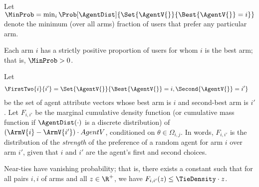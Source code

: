 Let $\MinProb = \min_{i} \Prob[\AgentDist]{\Set{\AgentV{}}{\Best{\AgentV{}} = i}}$
denote the minimum (over all arms) fraction of users that prefer any
particular arm.

\begin{assumption} \label{A3}
Each arm $i$ has a strictly positive proportion of users for whom $i$
is the best arm; that is, $\MinProb > 0$.
\end{assumption}

Let 
\begin{align*}
\FirstTwo{i}{i'}
  & = \Set{\AgentV{}}{\Best{\AgentV{}} = i, \Second{\AgentV{}} = i'}
\end{align*}
be the set of agent attribute vectors whose best arm is $i$ and
second-best arm is $i'$.
Let $F_{i,i'}$ be the marginal cumulative density function
(or cumulative mass function if $\AgentDist(\cdot)$ is a discrete distribution)
of $(\ArmV{i}-\ArmV{i'}) \cdot AgentV{}$,
conditioned on $\theta \in \Omega_{i,j}$.
In words, $F_{i,i'}$ is the distribution of the \emph{strength} of the
preference of a random agent for arm $i$ over arm $i'$, given that
$i$ and $i'$ are the agent's first and second choices.

\begin{assumption} \label{A1}
Near-ties have vanishing probability; 
that is, there exists a constant \TieDensity such that
for all pairs $i,i$ of arms and all $z \in \R^+$,
we have $F_{i,i'}(z) \leq \TieDensity \cdot z$.
\end{assumption}






